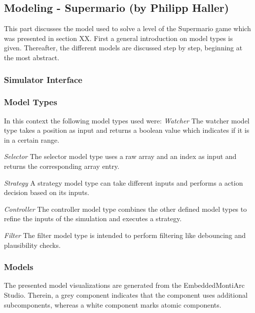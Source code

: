 \newpage
\subsection{ Modeling - Supermario (by Philipp Haller)}

This part discusses the model used to solve a level of the Supermario game which was presented in section XX. First a general introduction on model types is given. Thereafter, the different models are discussed step by step, beginning at the most abstract.

\subsubsection{Simulator Interface}


\subsubsection{Model Types}

In this context the following model types used were:
\emph{Watcher} \newline
The watcher model type takes a position as input and returns a boolean value which indicates if it is in a certain range.

\emph{Selector} \newline
The selector model type uses a raw array and an index as input and returns the corresponding array entry.

\emph{Strategy} \newline
A strategy model type can take different inputs and performs a action decision based on its inputs.

\emph{Controller} \newline
The controller model type combines the other defined model types to refine the inputs of the simulation and executes a strategy.

\emph{Filter} \newline
The filter model type is intended to perform filtering like debouncing and plausibility checks.

\subsubsection{Models}
The presented model visualizations are generated from the EmbeddedMontiArc Studio. Therein, a grey component indicates that the component uses additional subcomponents, whereas a white component marks atomic components. 


